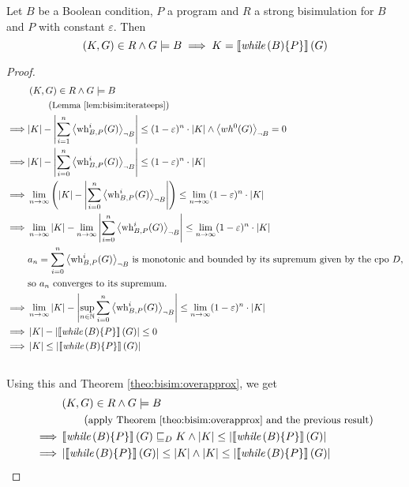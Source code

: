 \begin{theorem}[continues=theo:bisim:loopsmtx, label=proof:bisim:loopsmtx]
	Let $B$ be a Boolean condition, $P$ a program and $R$ a strong bisimulation for $B$ and $P$ with constant $\varepsilon$. Then
	\[ \left( K, G \right) \in R \land G \models B \implies K = \left\llbracket \textit{while}\,(B) \{P\} \right\rrbracket(G) \]
	\begin{proof}
		\begin{align*}
		 & \left( K, G \right) \in R \land G \models B \\
		 & \hspace*{2em} \left(\text{\small Lemma \ref{lem:bisim:iterateeps}}\right) \\
		\implies & |K| - \left| \sum_{i=1}^{n} \left\langle \operatorname{wh}_{B, P}^i(G) \right\rangle_{\lnot B} \right|
			\leq (1-\varepsilon)^n \cdot |K|
			\land \left\langle wh^0(G) \right\rangle_{\lnot B} = 0 \\
		\implies & |K| - \left| \sum_{i=0}^{n} \left\langle \operatorname{wh}_{B, P}^i(G) \right\rangle_{\lnot B} \right|
			\leq (1-\varepsilon)^n \cdot |K| \\
		\implies & \lim_{n \to \infty}
		\left( |K| - \left| \sum_{i=0}^{n} \left\langle \operatorname{wh}_{B, P}^i(G) \right\rangle_{\lnot B} \right| \right)
		\leq \lim_{n \to \infty} (1-\varepsilon)^n \cdot |K| \\
		\implies & \lim_{n \to \infty} \left| K \right| -
		\lim_{n \to \infty} \left| \sum_{i=0}^{n} \left\langle \operatorname{wh}_{B, P}^i(G) \right\rangle_{\lnot B} \right|
		\leq \lim_{n \to \infty} (1-\varepsilon)^n \cdot |K| \\
		& \text{$a_n = \sum_{i=0}^{n} \left\langle \operatorname{wh}_{B, P}^i(G) \right\rangle_{\lnot B}$ is monotonic and bounded by its supremum given by the cpo $D$,} \\
		& \text{so $a_n$ converges to its supremum.} \\
		\implies & \lim_{n \to \infty} \left| K \right| -
		\left| \sup_{n \in \mathbb{N}} \sum_{i=0}^{n} \left\langle \operatorname{wh}_{B, P}^i(G) \right\rangle_{\lnot B} \right|
		\leq \lim\limits_{n \to \infty} (1-\varepsilon)^n \cdot |K| \\
		\implies & \left| K \right| - \left| \left\llbracket \textit{while}\,(B) \{P\} \right\rrbracket(G) \right| \leq 0 \\
		\implies & \left| K \right| \leq \left| \left\llbracket \textit{while}\,(B) \{P\} \right\rrbracket(G) \right|
		\end{align*}
		\\
		Using this and Theorem \ref{theo:bisim:overapprox}, we get
		\begin{align*}
		& \pair{K, G} \in R \land G \models B \\
		& \explain{apply Theorem \ref{theo:bisim:overapprox} and the previous result} \\
		\implies & \smtx{\while{B}{P}}(G) \leqD K \land |K| \leq \l| \smtx{\while{B}{P}}(G) \r| \\
		\implies & \l| \smtx{\while{B}{P}}(G) \r| \leq |K| \land
		|K| \leq \l| \smtx{\while{B}{P}}(G) \r| \\

\end{align*}
\end{proof}
\end{theorem}
